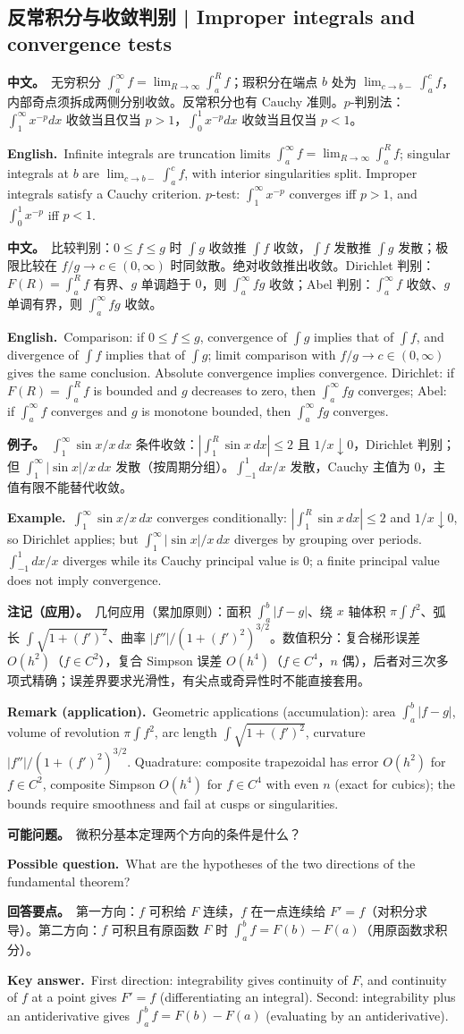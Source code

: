 \documentclass[UTF8,11pt,a4paper]{ctexart}
\newcommand{\BOTH}[2]{\par\noindent\textbf{中文。}\ #1\par\noindent\textbf{English.}\ #2\par}
\newcommand{\EX}[2]{\par\noindent\textbf{例子。}\ #1\par\noindent\textbf{Example.}\ #2\par}
\newcommand{\ASK}[4]{\begin{samepage}\par\noindent\textbf{可能问题。}\ #1\par\noindent\textbf{Possible question.}\ #2\par\noindent\textbf{回答要点。}\ #3\par\noindent\textbf{Key answer.}\ #4\medskip\end{samepage}}
\newcommand{\REMARK}[2]{\par\noindent\textbf{注记（应用）。}\ #1\par\noindent\textbf{Remark (application).}\ #2\par}
\begin{document}
\subsection{反常积分与收敛判别 | Improper integrals and convergence tests}
\BOTH{无穷积分 $\int_a^\infty f=\lim_{R\to\infty}\int_a^Rf$；瑕积分在端点 $b$ 处为 $\lim_{c\to b-}\int_a^cf$，内部奇点须拆成两侧分别收敛。反常积分也有 Cauchy 准则。$p$-判别法：$\int_1^\infty x^{-p}dx$ 收敛当且仅当 $p>1$，$\int_0^1x^{-p}dx$ 收敛当且仅当 $p<1$。}{Infinite integrals are truncation limits $\int_a^\infty f=\lim_{R\to\infty}\int_a^Rf$; singular integrals at $b$ are $\lim_{c\to b-}\int_a^cf$, with interior singularities split. Improper integrals satisfy a Cauchy criterion. $p$-test: $\int_1^\infty x^{-p}$ converges iff $p>1$, and $\int_0^1x^{-p}$ iff $p<1$.}
\BOTH{比较判别：$0\le f\le g$ 时 $\int g$ 收敛推 $\int f$ 收敛，$\int f$ 发散推 $\int g$ 发散；极限比较在 $f/g\to c\in(0,\infty)$ 时同敛散。绝对收敛推出收敛。Dirichlet 判别：$F(R)=\int_a^Rf$ 有界、$g$ 单调趋于 $0$，则 $\int_a^\infty fg$ 收敛；Abel 判别：$\int_a^\infty f$ 收敛、$g$ 单调有界，则 $\int_a^\infty fg$ 收敛。}{Comparison: if $0\le f\le g$, convergence of $\int g$ implies that of $\int f$, and divergence of $\int f$ implies that of $\int g$; limit comparison with $f/g\to c\in(0,\infty)$ gives the same conclusion. Absolute convergence implies convergence. Dirichlet: if $F(R)=\int_a^Rf$ is bounded and $g$ decreases to zero, then $\int_a^\infty fg$ converges; Abel: if $\int_a^\infty f$ converges and $g$ is monotone bounded, then $\int_a^\infty fg$ converges.}
\EX{$\int_1^\infty\sin x/x\,dx$ 条件收敛：$|\int_1^R\sin x\,dx|\le2$ 且 $1/x\downarrow0$，Dirichlet 判别；但 $\int_1^\infty|\sin x|/x\,dx$ 发散（按周期分组）。$\int_{-1}^1dx/x$ 发散，Cauchy 主值为 $0$，主值有限不能替代收敛。}{$\int_1^\infty\sin x/x\,dx$ converges conditionally: $|\int_1^R\sin x\,dx|\le2$ and $1/x\downarrow0$, so Dirichlet applies; but $\int_1^\infty|\sin x|/x\,dx$ diverges by grouping over periods. $\int_{-1}^1dx/x$ diverges while its Cauchy principal value is $0$; a finite principal value does not imply convergence.}
\REMARK{几何应用（累加原则）：面积 $\int_a^b|f-g|$、绕 $x$ 轴体积 $\pi\int f^2$、弧长 $\int\sqrt{1+(f')^2}$、曲率 $|f''|/(1+(f')^2)^{3/2}$。数值积分：复合梯形误差 $O(h^2)$（$f\in C^2$），复合 Simpson 误差 $O(h^4)$（$f\in C^4$，$n$ 偶），后者对三次多项式精确；误差界要求光滑性，有尖点或奇异性时不能直接套用。}{Geometric applications (accumulation): area $\int_a^b|f-g|$, volume of revolution $\pi\int f^2$, arc length $\int\sqrt{1+(f')^2}$, curvature $|f''|/(1+(f')^2)^{3/2}$. Quadrature: composite trapezoidal has error $O(h^2)$ for $f\in C^2$, composite Simpson $O(h^4)$ for $f\in C^4$ with even $n$ (exact for cubics); the bounds require smoothness and fail at cusps or singularities.}
\ASK{微积分基本定理两个方向的条件是什么？}{What are the hypotheses of the two directions of the fundamental theorem?}{第一方向：$f$ 可积给 $F$ 连续，$f$ 在一点连续给 $F'=f$（对积分求导）。第二方向：$f$ 可积且有原函数 $F$ 时 $\int_a^bf=F(b)-F(a)$（用原函数求积分）。}{First direction: integrability gives continuity of $F$, and continuity of $f$ at a point gives $F'=f$ (differentiating an integral). Second: integrability plus an antiderivative gives $\int_a^bf=F(b)-F(a)$ (evaluating by an antiderivative).}
\end{document}
